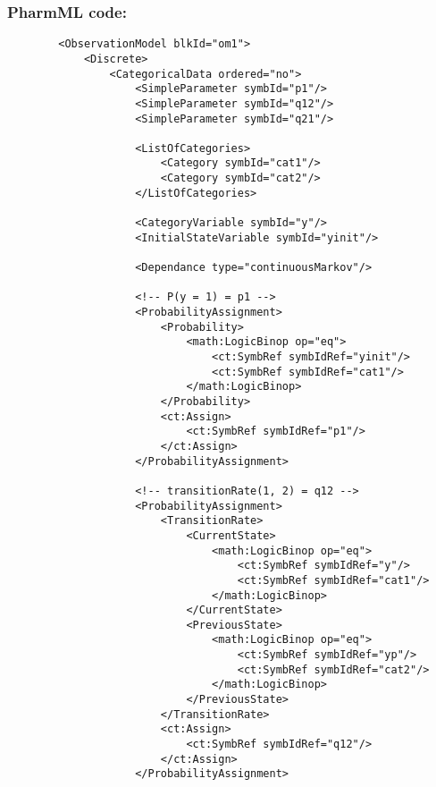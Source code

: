 \myEndLine

\subsubsection{PharmML code:}

\lstset{language=XML}
\begin{lstlisting}
        <ObservationModel blkId="om1">
            <Discrete>
                <CategoricalData ordered="no">
                    <SimpleParameter symbId="p1"/>
                    <SimpleParameter symbId="q12"/>
                    <SimpleParameter symbId="q21"/>
                    
                    <ListOfCategories>
                        <Category symbId="cat1"/>
                        <Category symbId="cat2"/>
                    </ListOfCategories>
                    
                    <CategoryVariable symbId="y"/>
                    <InitialStateVariable symbId="yinit"/>
                    
                    <Dependance type="continuousMarkov"/>
                    
                    <!-- P(y = 1) = p1 -->
                    <ProbabilityAssignment>
                        <Probability>
                            <math:LogicBinop op="eq">
                                <ct:SymbRef symbIdRef="yinit"/>
                                <ct:SymbRef symbIdRef="cat1"/>
                            </math:LogicBinop>
                        </Probability>
                        <ct:Assign>
                            <ct:SymbRef symbIdRef="p1"/>
                        </ct:Assign>
                    </ProbabilityAssignment>
                    
                    <!-- transitionRate(1, 2) = q12 -->
                    <ProbabilityAssignment>
                        <TransitionRate>
                            <CurrentState> 
                                <math:LogicBinop op="eq">
                                    <ct:SymbRef symbIdRef="y"/>
                                    <ct:SymbRef symbIdRef="cat1"/>
                                </math:LogicBinop>
                            </CurrentState>
                            <PreviousState>
                                <math:LogicBinop op="eq">
                                    <ct:SymbRef symbIdRef="yp"/>
                                    <ct:SymbRef symbIdRef="cat2"/>
                                </math:LogicBinop>
                            </PreviousState>
                        </TransitionRate>
                        <ct:Assign>
                            <ct:SymbRef symbIdRef="q12"/>
                        </ct:Assign>
                    </ProbabilityAssignment>
                    

\end{lstlisting}
